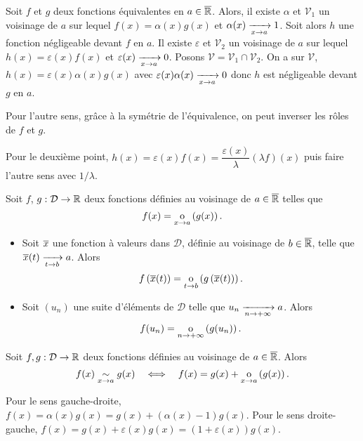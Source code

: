 \documentclass{magnoliaold}
\begin{document}
\begin{preuve}
Soit $f$ et $g$ deux fonctions équivalentes en $a\in\overline{\mathbb{R}}$. Alors, il existe $\alpha$ et $\mathcal{V}_1$ un voisinage de $a$ sur lequel $f(x)=\alpha(x)g(x)$ et $\alpha(x)\xrightarrow[x\rightarrow a]{}1$. Soit alors $h$ une fonction négligeable devant $f$ en $a$. Il existe $\varepsilon$ et $\mathcal{V}_2$ un voisinage de $a$ sur lequel $h(x)=\varepsilon(x)f(x)$ et $\varepsilon(x)\xrightarrow[x\rightarrow a]{}0$. Posons $\mathcal{V}=\mathcal{V}_1\cap\mathcal{V}_2$. On a sur $\mathcal{V}$, $h(x)=\varepsilon(x)\alpha(x)g(x)$ avec $\varepsilon(x)\alpha(x)\xrightarrow[x\rightarrow a]{}0$ donc $h$ est négligeable devant $g$ en $a$.

Pour l'autre sens, grâce à la symétrie de l'équivalence, on peut inverser les rôles de $f$ et $g$.

\medskip

Pour le deuxième point, $h(x)=\varepsilon(x)f(x)=\dfrac{\varepsilon(x)}{\lambda}(\lambda f)(x)$ puis faire l'autre sens avec $1/\lambda$.
\end{preuve}

\begin{proposition}[utile=-3]
  Soit $f$, $g:\mathcal{D}\to\mathbb{R}$ deux fonctions définies au voisinage de
  $a\in\overline{\mathbb{R}}$ telles que
  \[f(x)=\underset{x \rightarrow a}{\text{o}}\left(g(x)\right).\]
  \begin{itemize}
  \item Soit $\overline{x}$ une fonction à valeurs dans $\mathcal{D}$,
    définie au voisinage de $b\in\overline{\mathbb{R}}$, telle que
    $\overline{x}(t)\xrightarrow[t\rightarrow b]{}a$. Alors
    \[f\left(\overline{x}(t)\right)=\underset{t \rightarrow b}{\text{o}}\left(g\left(\overline{x}(t)\right)\right).\]
  \item Soit $(u_n)$ une suite d'éléments de $\mathcal{D}$
    telle que $u_n\xrightarrow[n\rightarrow +\infty]{} a$. Alors
    \[f(u_n)=\underset{n \rightarrow +\infty}{\text{o}}\left(g(u_n)\right).\]
  \end{itemize}
  \end{proposition}


\begin{proposition}[utile=-3]
Soit $f,g:\mathcal{D}\to\mathbb{R}$ deux fonctions définies au voisinage de $a\in\overline{\mathbb{R}}$. Alors
\[f(x)\underset{x\rightarrow a}{\sim}g(x) \quad\Longleftrightarrow\quad f(x)=g(x)+\underset{x \rightarrow a}{\text{o}}\left(g(x)\right).\]  
\end{proposition}

\begin{preuve}
Pour le sens gauche-droite, $f(x)=\alpha(x)g(x)=g(x)+(\alpha(x)-1)g(x)$. Pour le sens droite-gauche, $f(x)=g(x)+\varepsilon(x)g(x)=(1+\varepsilon(x))g(x)$.
\end{preuve}
\end{document}

